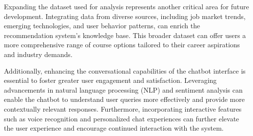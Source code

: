 Expanding the dataset used for analysis represents another critical area for future development. Integrating data from diverse sources, including job market trends, emerging technologies, and user behavior patterns, can enrich the recommendation system's knowledge base. This broader dataset can offer users a more comprehensive range of course options tailored to their career aspirations and industry demands.

Additionally, enhancing the conversational capabilities of the chatbot interface is essential to foster greater user engagement and satisfaction. Leveraging advancements in natural language processing (NLP) and sentiment analysis can enable the chatbot to understand user queries more effectively and provide more contextually relevant responses. Furthermore, incorporating interactive features such as voice recognition and personalized chat experiences can further elevate the user experience and encourage continued interaction with the system.